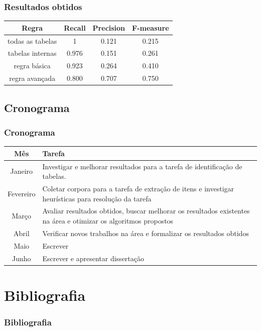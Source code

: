 \documentclass{beamer}
\begin{document}
\begin{frame}
\frametitle{Resultados obtidos}
  \begin{center}
  \small{
  \begin{tabular}{| c | c | c | c |}
    \hline
    Regra & Recall & Precision & F-measure \\ \hline
    todas as tabelas & 1 & 0.121 & 0.215 \\ \hline
    tabelas internas & 0.976 & 0.151 & 0.261 \\ \hline
    regra básica & 0.923 & 0.264 & 0.410 \\ \hline
    regra avançada & 0.800 & 0.707 & 0.750 \\ \hline
  \end{tabular}
}
  \end{center}

\end{frame}

\subsection{Cronograma}

\begin{frame}
  \frametitle{Cronograma}
  \begin{center}
  \small{
  \begin{tabular}{| c | p{8cm} |}
    \hline
    Mês & Tarefa \\ \hline

    Janeiro & Investigar e melhorar resultados para a tarefa de identificação de tabelas. \\ \hline

    Fevereiro & Coletar corpora para a tarefa de extração de itens e investigar heurísticas para resolução da tarefa \\ \hline

    Março & Avaliar resultados obtidos, buscar melhorar os resultados
    existentes na área e otimizar os algoritmos propostos\\ \hline

    Abril &  Verificar novos trabalhos na área e formalizar os
    resultados obtidos \\ \hline

    Maio & Escrever \\ \hline

    Junho & Escrever e apresentar dissertação \\ \hline
  \end{tabular}
  }
  \end{center}

\end{frame}

\section*{Bibliografia}

\begin{frame}[allowframebreaks]
  \frametitle{Bibliografia}
   
  
\end{frame}
\end{document}
